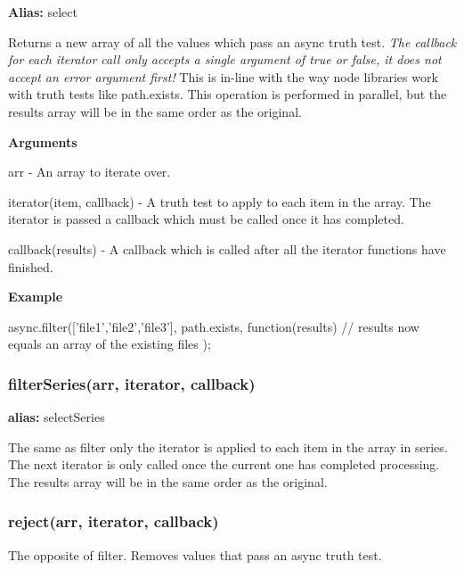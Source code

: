 {\bfseries Alias\+:} select

Returns a new array of all the values which pass an async truth test. {\itshape The callback for each iterator call only accepts a single argument of true or false, it does not accept an error argument first!} This is in-\/line with the way node libraries work with truth tests like path.\+exists. This operation is performed in parallel, but the results array will be in the same order as the original.

{\bfseries Arguments}


\begin{DoxyItemize}
\item arr -\/ An array to iterate over.
\item iterator(item, callback) -\/ A truth test to apply to each item in the array. The iterator is passed a callback which must be called once it has completed.
\item callback(results) -\/ A callback which is called after all the iterator functions have finished.
\end{DoxyItemize}

{\bfseries Example} \begin{DoxyVerb}async.filter(['file1','file2','file3'], path.exists, function(results){
    // results now equals an array of the existing files
});
\end{DoxyVerb}






\label{_filterSeries}%
 \subsubsection*{filter\+Series(arr, iterator, callback)}

{\bfseries alias\+:} select\+Series

The same as filter only the iterator is applied to each item in the array in series. The next iterator is only called once the current one has completed processing. The results array will be in the same order as the original. 



\label{_reject}%
 \subsubsection*{reject(arr, iterator, callback)}

The opposite of filter. Removes values that pass an async truth test. 




